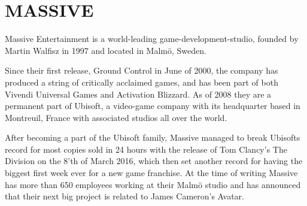 
%
%
%


%
%


\section[MASSIVE Entertainment | A Ubisoft studio]{MASSIVE}

{}

  Massive Entertainment is a world-leading game-development-studio, founded by
  Martin Walfisz in 1997 and located in Malmö, Sweden.

  Since their first release, Ground Control in June of 2000,
  the company has produced a string of critically acclaimed games,
  and has been part of both Vivendi Universal Games and Activation Blizzard. As
  of 2008 they are a permanent part of Ubisoft, a video-game company
  with its headquarter based in Montreuil, France with associated studios all
  over the world.

  After becoming a part of the Ubisoft family, Massive managed to break
  Ubisofts record for most copies sold in 24 hours with the release of Tom
  Clancy's The Division on the 8'th of March 2016, which then set another
  record for having the biggest first week ever for a new game franchise.
  At the time of writing Massive has more than 650 employees working at their
  Malmö studio and has announced that their next big project is related to
  James Cameron's Avatar.

